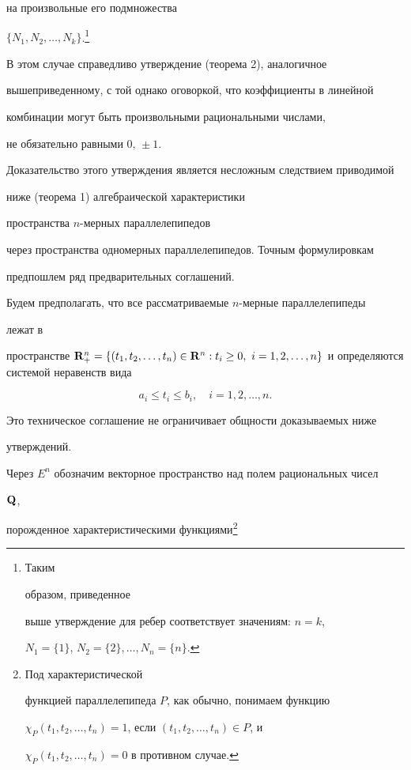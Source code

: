 на произвольные его подмножества 


$\{N_1,N_2,\dotsc,N_k\}$.\footnote{Таким 


образом, приведенное  


выше утверждение для ребер соответствует значениям: $n=k$, 


$N_1=\{1\}$, $N_2=\{2\},\dotsc,N_n=\{n\}$.} 


В этом случае справедливо утверждение (теорема 2), аналогичное  


вышеприведенному, с той однако оговоркой, что коэффициенты в линейной  


комбинации могут быть произвольными рациональными числами, 


не обязательно равными $0,\,\pm1$. 


 


Доказательство этого утверждения является несложным следствием приводимой  


ниже (теорема 1) алгебраической характеристики  


пространства $n$-мерных параллелепипедов  


через пространства одномерных параллелепипедов. Точным формулировкам  


предпошлем ряд предварительных соглашений. 


 


Будем предполагать, что все рассматриваемые $n$-мерные параллелепипеды 


лежат в  


пространстве $\bold R^n_+=\{(t_1,t_2,\dotsc,t_n)\in\bold R^n:t_i\ge0,\ 


i=1,2,\dotsc,n\}$ и определяются системой неравенств вида 


\begin{equation} 


a_i\le t_i\le b_i,\quad i=1,2,\dotsc,n. 


\end{equation} 


Это техническое соглашение не ограничивает общности доказываемых ниже  


утверждений.  


 


Через $E^n$ обозначим векторное пространство над полем рациональных чисел 


$\bold Q$, 


порожденное характеристическими функциями\footnote{Под характеристической  


функцией параллелепипеда $P$, как обычно, понимаем функцию  


$\chi_P(t_1,t_2,\dotsc,t_n)=1$, если $(t_1,t_2,\dotsc,t_n)\in P$, и 


$\chi_P(t_1,t_2,\dotsc,t_n)=0$ в противном случае.} 


